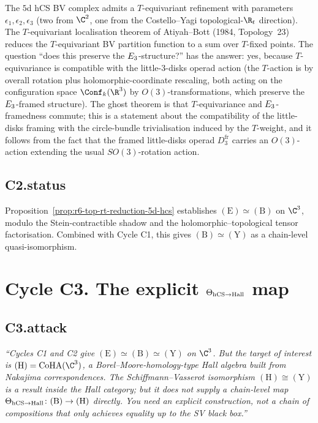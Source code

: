 \begin{remark}
\label{rem:r6-ghost-theorem-bv-equivariant-preserves-e3}
The $5$d hCS BV complex admits a $T$-equivariant refinement with
parameters $\epsilon_1, \epsilon_2, \epsilon_3$ (two from $\C^2$, one
from the Costello--Yagi topological-$\R_t$ direction). The
$T$-equivariant localisation theorem of Atiyah--Bott (1984,
Topology~23) reduces the $T$-equivariant BV partition function to a
sum over $T$-fixed points. The question ``does this preserve the
$E_3$-structure?'' has the answer: yes, because
$T$-equivariance is compatible with the little-$3$-disks operad action
(the $T$-action is by overall rotation plus holomorphic-coordinate
rescaling, both acting on the configuration space $\Conf_k(\R^3)$ by
$O(3)$-transformations, which preserve the $E_3$-framed structure).
The ghost theorem is that $T$-equivariance and $E_3$-framedness
commute; this is a statement about the compatibility of the little-disks
framing with the circle-bundle trivialisation induced by the
$T$-weight, and it follows from the fact that the framed little-disks
operad $D_3^{\mathrm{fr}}$ carries an $O(3)$-action extending the usual
$SO(3)$-rotation action.
\end{remark}

\subsection*{C2.status}

Proposition~\ref{prop:r6-top-rt-reduction-5d-hcs} establishes
$(\mathrm E)\simeq(\mathrm B)$ on $\C^3$, modulo the Stein-contractible
shadow and the holomorphic--topological tensor factorisation. Combined
with Cycle C1, this gives $(\mathrm B)\simeq(\mathrm Y)$ as a chain-level
quasi-isomorphism.

\section*{Cycle C3. The explicit $\Theta_{\mathrm{hCS}\to\mathrm{Hall}}$ map}

\subsection*{C3.attack}

\emph{``Cycles C1 and C2 give $(\mathrm E)\simeq(\mathrm B)\simeq(\mathrm Y)$ on $\C^3$.
But the target of interest is $(\mathrm H) = \CoHA(\C^3)$, a
Borel--Moore-homology-type Hall algebra built from Nakajima
correspondences. The Schiffmann--Vasserot isomorphism
$(\mathrm H)\cong(\mathrm Y)$ is a result \emph{inside} the Hall
category; but it does not supply a chain-level map
$\Theta_{\mathrm{hCS}\to\mathrm{Hall}}\colon(\mathrm B)\to(\mathrm H)$ directly. You
need an explicit construction, not a chain of compositions that only
achieves equality up to the SV black box.''}


